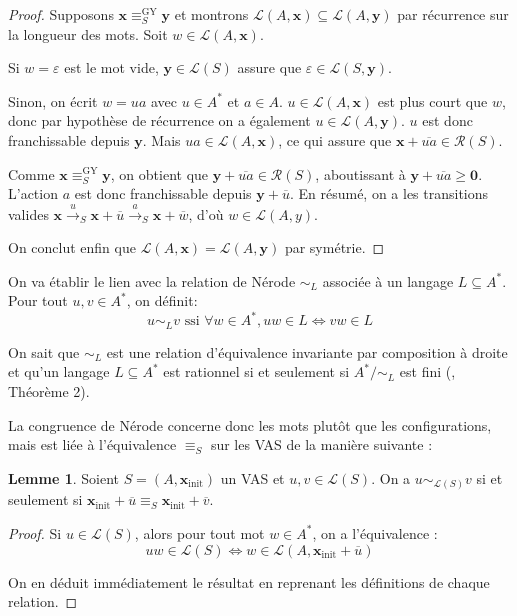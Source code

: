 \documentclass[a4paper,final]{article}
\theoremstyle{definition}
\newtheorem{Lemma}[Theorem]{Lemme}
\let\epsilon\varepsilon
\let\geq\geqslant
\newcommand{\lang}{\ensuremath{\mathcal{L}}}
\newcommand{\reach}{\ensuremath{\mathcal{R}}}
\newcommand{\trans}[2]{\ensuremath{\stackrel{#1}{\longrightarrow}_{#2}}}
\newcommand{\vect}[1]{\ensuremath{\mathbf{#1}}}
\newcommand{\rel}{\ensuremath{\equiv}}
\newcommand{\relGY}{\ensuremath{\equiv^\text{GY}_S}}
\newcommand{\ssi}{\ensuremath{\text{ ssi }}}
\newcommand{\equivaut}{\ensuremath{\Leftrightarrow}}
\newcommand{\xinit}{\ensuremath{\vect{x}_\text{init}}}
\newcommand{\valeur}[1]{\ensuremath{\overline{#1}}}
\begin{document}
\begin{proof}
Supposons $\vect{x} \relGY \vect{y}$ et montrons $\lang(A,\vect{x}) \subseteq \lang(A,\vect{y})$ par récurrence sur la longueur des mots.
Soit $w\in\lang(A,\vect{x})$.

Si $w=\epsilon$ est le mot vide, $\vect{y} \in\lang(S)$ assure que $\epsilon\in\lang(S,\vect{y})$.

Sinon, on écrit $w=ua$ avec $u\in A^\ast$ et $a\in A$.
$u\in\lang(A,\vect{x})$ est plus court que $w$, donc par hypothèse de récurrence on a également $u\in\lang(A,\vect{y})$.
$u$ est donc franchissable depuis $\vect{y}$.
Mais $ua\in\lang(A,\vect{x})$, ce qui assure que $\vect{x} +\valeur{ua}\in\reach(S)$.

Comme $\vect{x} \relGY \vect{y}$, on obtient que $\vect{y} +\valeur{ua} \in\reach(S)$, aboutissant à $\vect{y} +\valeur{ua} \geq\vect{0}$.
L'action $a$ est donc franchissable depuis $\vect{y} +\valeur{u}$.
En résumé, on a les transitions valides $\vect{x} \trans{u}{S} \vect{x} +\valeur{u} \trans{a}{S} \vect{x} +\valeur{w}$, d'où $w\in\lang(A,y)$.

On conclut enfin que $\lang(A,\vect{x}) = \lang(A,\vect{y})$ par symétrie.
\end{proof}

On va établir le lien avec la relation de Nérode $\sim_L$ associée à un langage $L \subseteq A^*$. 
Pour tout $u,v\in A^\ast$, on définit: 
$$ u\sim_L v \ssi \forall w\in A^\ast, uw\in L \equivaut vw\in L $$


On sait que $\sim_L$ est une relation d'équivalence invariante par composition à droite et qu'un langage $L \subseteq A^*$ est rationnel si et seulement si $A^*/\sim_L$ est fini (\cite{rasc59}, Théorème 2).


La congruence de Nérode concerne donc les mots plutôt que les configurations, mais est liée à l'équivalence $ \rel_S$ sur les VAS de la manière suivante :

\begin{Lemma}\label{lien avec Nérode}
    Soient $S=(A,\xinit)$ un VAS et $u,v\in\lang(S)$.
    On a $u\sim_{\lang(S)}v$ si et seulement si $\xinit +\valeur{u} \rel_S \xinit +\valeur{v}$.
\end{Lemma}

\begin{proof}
Si $u\in\lang(S)$, alors pour tout mot $w\in A^\ast$, on a l'équivalence :
$$uw\in\lang(S) \equivaut w\in\lang(A,\xinit +\valeur{u})$$

On en déduit immédiatement le résultat en reprenant les définitions de chaque relation.
\end{proof}
\end{document}
